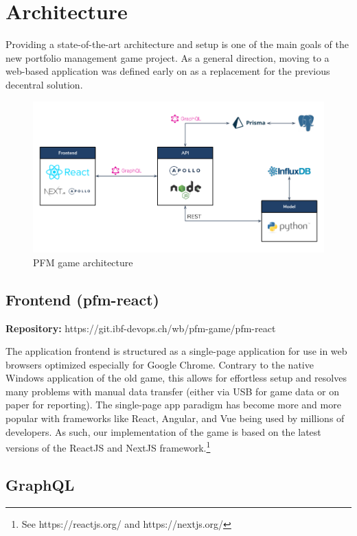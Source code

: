 \section{Architecture}
\label{sec:architecture}

Providing a state-of-the-art architecture and setup is one of the main goals of the new portfolio management game project. As a general direction, moving to a web-based application was defined early on as a replacement for the previous decentral solution.

\begin{figure}[h!]
  \centering
  \includegraphics[scale=0.45]{img/architecture.png}
  \caption{PFM game architecture}
\end{figure}


\subsection{Frontend (pfm-react)}
\begin{flushright}
  \textbf{Repository:} https://git.ibf-devops.ch/wb/pfm-game/pfm-react
\end{flushright}

The application frontend is structured as a single-page application for use in web browsers optimized especially for Google Chrome. Contrary to the native Windows application of the old game, this allows for effortless setup and resolves many problems with manual data transfer (either via USB for game data or on paper for reporting). The single-page app paradigm has become more and more popular with frameworks like React, Angular, and Vue being used by millions of developers. As such, our implementation of the game is based on the latest versions of the ReactJS and NextJS framework.\footnote{See https://reactjs.org/ and https://nextjs.org/}


\subsection{GraphQL}

